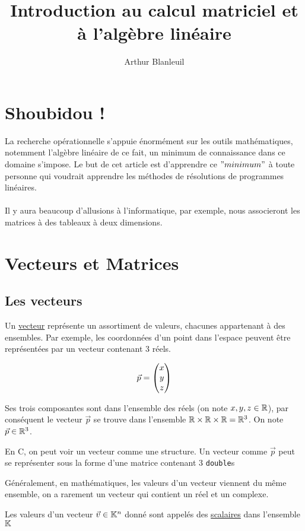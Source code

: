 \documentclass[a4paper, 11pt]{article}
\begin{document}
\title{Introduction au calcul matriciel et à l'algèbre linéaire}
\author{Arthur Blanleuil}

\maketitle

\section{Shoubidou !}

La recherche opérationnelle s'appuie énormément sur les outils mathématiques, notemment l'algèbre linéaire
de ce fait, un minimum de connaissance dans ce domaine s'impose. Le but de cet article est d'apprendre ce
$"minimum"$ à toute personne qui voudrait apprendre les méthodes de résolutions de programmes linéaires. \\ \\

Il y aura beaucoup d'allusions à l'informatique, par exemple, nous associeront les matrices à des tableaux à
deux dimensions.

\section{Vecteurs et Matrices}

\subsection{Les vecteurs}

Un \underline{vecteur} représente un assortiment de valeurs, chacunes appartenant à des ensembles.
Par exemple, les coordonnées d'un point dans l'espace peuvent être représentées par un vecteur contenant
3 réels.

\[
  \vec{p} = \begin{pmatrix} x \\ y \\ z \end{pmatrix}
\]

Ses trois composantes sont dans l'ensemble des réels (on note $x, y, z \in \mathbb{R}$), par conséquent le vecteur $\vec{p}$
se trouve dans l'ensemble $\mathbb{R} \times \mathbb{R} \times \mathbb{R} = \mathbb{R}^3$. On note $\vec{p} \in \mathbb{R}^3$.

En C, on peut voir un vecteur comme une structure. Un vecteur comme $\vec{p}$ peut se représenter sous la forme d'une matrice
contenant 3 \texttt{double}s

Généralement, en mathématiques, les valeurs d'un vecteur viennent du même ensemble, on a rarement un vecteur qui contient un
réel et un complexe.

Les valeurs d'un vecteur $\vec{v} \in \mathbb{K}^n$ donné sont appelés des \underline{scalaires} dans l'ensemble $\mathbb{K}$
\end{document}
